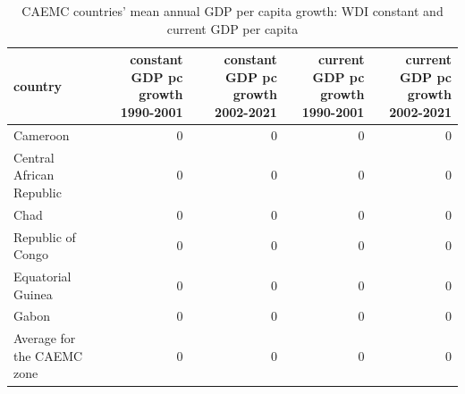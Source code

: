 \begin{table}

\caption{CAEMC countries' mean annual GDP per capita growth: WDI constant and current GDP per capita}
\centering
\begin{tabular}[t]{lrrrr}
\toprule
country & constant GDP pc growth 1990-2001 & constant GDP pc growth 2002-2021 & current GDP pc growth 1990-2001 & current GDP pc growth 2002-2021\\
\midrule
Cameroon & 0 & 0 & 0 & 0\\
Central African Republic & 0 & 0 & 0 & 0\\
Chad & 0 & 0 & 0 & 0\\
Republic of Congo & 0 & 0 & 0 & 0\\
Equatorial Guinea & 0 & 0 & 0 & 0\\
\addlinespace
Gabon & 0 & 0 & 0 & 0\\
Average for the CAEMC zone & 0 & 0 & 0 & 0\\
\bottomrule
\end{tabular}
\end{table}
